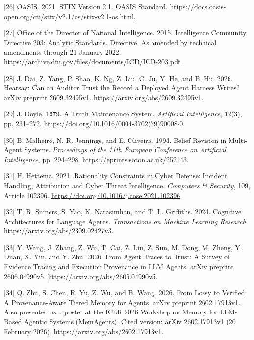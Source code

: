 \documentclass[
  11pt,
]{article}
\newlength{\cslhangindent}
\newlength{\cslentryspacingunit} %
\newenvironment{CSLReferences}[2] %
 {%
  \setlength{\parindent}{0pt}
  \ifodd #1
  \let\oldpar\par
  \def\par{\hangindent=\cslhangindent\oldpar}
  \fi
  \setlength{\parskip}{#2\cslentryspacingunit}
 }%
 {}
\begin{document}
\begin{CSLReferences}{1}{1}
\leavevmode{}%
{[}26{]} OASIS. 2021. STIX Version 2.1. OASIS Standard.
\url{https://docs.oasis-open.org/cti/stix/v2.1/os/stix-v2.1-os.html}.

\leavevmode{}%
{[}27{]} Office of the Director of National Intelligence. 2015.
Intelligence Community Directive 203: Analytic Standards. Directive. As
amended by technical amendments through 21 January 2022.
\url{https://archive.dni.gov/files/documents/ICD/ICD-203.pdf}.

\leavevmode{}%
{[}28{]} J. Dai, Z. Yang, P. Shao, K. Ng, Z. Liu, C. Ju, Y. He, and B.
Hu. 2026. Hearsay: Can an Auditor Trust the Record a Deployed Agent
Harness Writes? arXiv preprint 2609.32495v1.
\url{https://arxiv.org/abs/2609.32495v1}.

\leavevmode{}%
{[}29{]} J. Doyle. 1979. A Truth Maintenance System. \emph{Artificial
Intelligence}, 12(3), pp. 231--272.
\url{https://doi.org/10.1016/0004-3702(79)90008-0}.

\leavevmode{}%
{[}30{]} B. Malheiro, N. R. Jennings, and E. Oliveira. 1994. Belief
Revision in Multi-Agent Systems. \emph{Proceedings of the 11th European
Conference on Artificial Intelligence}, pp. 294--298.
\url{https://eprints.soton.ac.uk/252143}.

\leavevmode{}%
{[}31{]} H. Hettema. 2021. Rationality Constraints in Cyber Defense:
Incident Handling, Attribution and Cyber Threat Intelligence.
\emph{Computers \& Security}, 109, Article 102396.
\url{https://doi.org/10.1016/j.cose.2021.102396}.

\leavevmode{}%
{[}32{]} T. R. Sumers, S. Yao, K. Narasimhan, and T. L. Griffiths. 2024.
Cognitive Architectures for Language Agents. \emph{Transactions on
Machine Learning Research}. \url{https://arxiv.org/abs/2309.02427v3}.

\leavevmode{}%
{[}33{]} Y. Wang, J. Zhang, Z. Wu, T. Cai, Z. Liu, Z. Sun, M. Dong, M.
Zheng, Y. Duan, X. Yin, and Y. Zhu. 2026. From Agent Traces to Trust: A
Survey of Evidence Tracing and Execution Provenance in LLM Agents. arXiv
preprint 2606.04990v5. \url{https://arxiv.org/abs/2606.04990v5}.

\leavevmode{}%
{[}34{]} Q. Zhu, S. Chen, R. Yu, Z. Wu, and B. Wang. 2026. From Lossy to
Verified: A Provenance-Aware Tiered Memory for Agents. arXiv preprint
2602.17913v1. Also presented as a poster at the ICLR 2026 Workshop on
Memory for LLM-Based Agentic Systems (MemAgents). Cited version: arXiv
2602.17913v1 (20 February 2026).
\url{https://arxiv.org/abs/2602.17913v1}.


\end{CSLReferences}
\end{document}
